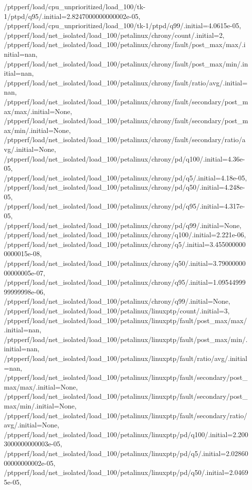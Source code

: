 {    /ptpperf/load/cpu_unprioritized/load_100/tk-1/ptpd/q95/.initial=2.8247000000000002e-05,
    /ptpperf/load/cpu_unprioritized/load_100/tk-1/ptpd/q99/.initial=4.0615e-05,
    /ptpperf/load/net_isolated/load_100/petalinux/chrony/count/.initial=2,
    /ptpperf/load/net_isolated/load_100/petalinux/chrony/fault/post_max/max/.initial=nan,
    /ptpperf/load/net_isolated/load_100/petalinux/chrony/fault/post_max/min/.initial=nan,
    /ptpperf/load/net_isolated/load_100/petalinux/chrony/fault/ratio/avg/.initial=nan,
    /ptpperf/load/net_isolated/load_100/petalinux/chrony/fault/secondary/post_max/max/.initial=None,
    /ptpperf/load/net_isolated/load_100/petalinux/chrony/fault/secondary/post_max/min/.initial=None,
    /ptpperf/load/net_isolated/load_100/petalinux/chrony/fault/secondary/ratio/avg/.initial=None,
    /ptpperf/load/net_isolated/load_100/petalinux/chrony/pd/q100/.initial=4.36e-05,
    /ptpperf/load/net_isolated/load_100/petalinux/chrony/pd/q5/.initial=4.18e-05,
    /ptpperf/load/net_isolated/load_100/petalinux/chrony/pd/q50/.initial=4.248e-05,
    /ptpperf/load/net_isolated/load_100/petalinux/chrony/pd/q95/.initial=4.317e-05,
    /ptpperf/load/net_isolated/load_100/petalinux/chrony/pd/q99/.initial=None,
    /ptpperf/load/net_isolated/load_100/petalinux/chrony/q100/.initial=2.221e-06,
    /ptpperf/load/net_isolated/load_100/petalinux/chrony/q5/.initial=3.4550000000000015e-08,
    /ptpperf/load/net_isolated/load_100/petalinux/chrony/q50/.initial=3.7900000000000005e-07,
    /ptpperf/load/net_isolated/load_100/petalinux/chrony/q95/.initial=1.0954499999999998e-06,
    /ptpperf/load/net_isolated/load_100/petalinux/chrony/q99/.initial=None,
    /ptpperf/load/net_isolated/load_100/petalinux/linuxptp/count/.initial=3,
    /ptpperf/load/net_isolated/load_100/petalinux/linuxptp/fault/post_max/max/.initial=nan,
    /ptpperf/load/net_isolated/load_100/petalinux/linuxptp/fault/post_max/min/.initial=nan,
    /ptpperf/load/net_isolated/load_100/petalinux/linuxptp/fault/ratio/avg/.initial=nan,
    /ptpperf/load/net_isolated/load_100/petalinux/linuxptp/fault/secondary/post_max/max/.initial=None,
    /ptpperf/load/net_isolated/load_100/petalinux/linuxptp/fault/secondary/post_max/min/.initial=None,
    /ptpperf/load/net_isolated/load_100/petalinux/linuxptp/fault/secondary/ratio/avg/.initial=None,
    /ptpperf/load/net_isolated/load_100/petalinux/linuxptp/pd/q100/.initial=2.2003000000000003e-05,
    /ptpperf/load/net_isolated/load_100/petalinux/linuxptp/pd/q5/.initial=2.0286000000000002e-05,
    /ptpperf/load/net_isolated/load_100/petalinux/linuxptp/pd/q50/.initial=2.04695e-05,
}
